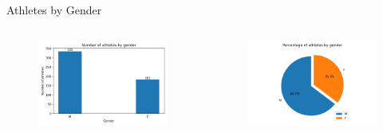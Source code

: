 \documentclass[aspectratio=169, xcolor=dvipsnames]{beamer}
\begin{document}
\begin{frame}{Athletes by Gender}
\begin{columns}[c]
\begin{column}{.5\textwidth}
\begin{figure}
    \centering
    \includegraphics[width=\textwidth]{img/athletesbygender.png}
\end{figure}
\end{column}

\begin{column}{.5\textwidth}
\begin{figure}
    \centering
    \includegraphics[width=\textwidth]{img/athletesbygender-pie.png}
\end{figure}
\end{column}
\end{columns}
\end{frame}
\end{document}
